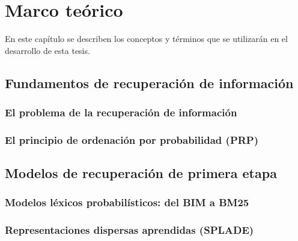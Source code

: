 \chapter{Marco teórico}\label{cap:marco}

En este capítulo se describen los conceptos y términos que se utilizarán en el desarrollo de esta tesis.

\section{Fundamentos de recuperación de información}\label{sec:marco-fundamentos}

\subsection{El problema de la recuperación de información}\label{subsec:marco-problema}

\subsection{El principio de ordenación por probabilidad (PRP)}\label{subsec:marco-prp}

\section{Modelos de recuperación de primera etapa}\label{sec:marco-primera-etapa}

\subsection{Modelos léxicos probabilísticos: del BIM a BM25}\label{subsec:marco-bm25}

\subsection{Representaciones dispersas aprendidas (SPLADE)}\label{subsec:marco-splade}

